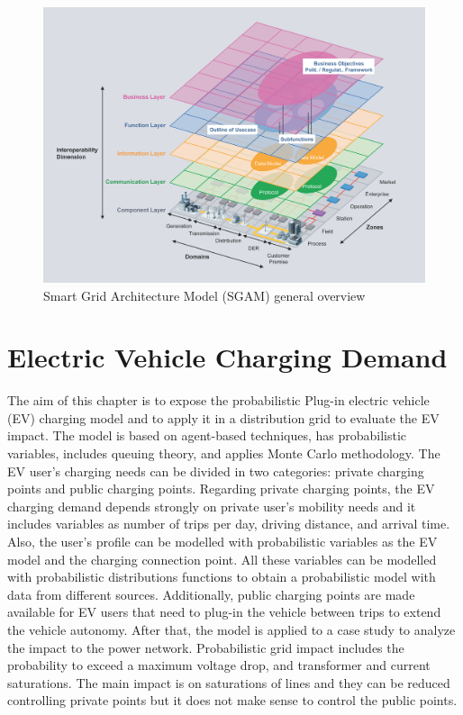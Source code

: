 \documentclass[a4paper,11pt,twoside,openright]{report}
\begin{document}
\begin{figure}[h!]
	\centering
	\includegraphics[scale=0.18]{Figures/SGAM_model}
	\caption{Smart Grid Architecture Model (SGAM) general overview}
	\label{fig:SGAM}
	
\end{figure}

\chapter{Electric Vehicle Charging Demand}
\label{ch:EV}
The aim of this chapter is to expose the probabilistic Plug-in electric vehicle (EV) charging model and to apply it in a distribution grid to evaluate the EV impact. The model is based on agent-based techniques, has probabilistic variables, includes queuing theory, and applies Monte Carlo methodology. The EV user's charging needs can be divided in two categories: private charging points and public charging points. Regarding private charging points, the EV charging demand depends strongly on private user's mobility needs and it includes variables as number of trips per day, driving distance, and arrival time. Also, the user's profile can be modelled with probabilistic variables as the EV model and the charging connection point. All these variables can be modelled with probabilistic distributions functions to obtain a probabilistic model with data from different sources. Additionally, public charging points are made available for EV users that need to plug-in the vehicle between trips to extend the vehicle autonomy. After that, the model is applied to a case study to analyze the impact to the power network. Probabilistic grid impact includes the probability to exceed a maximum voltage drop, and transformer and current saturations. The main impact is on saturations of lines and they can be reduced controlling private points but it does not make sense to control the public points.
\end{document}
